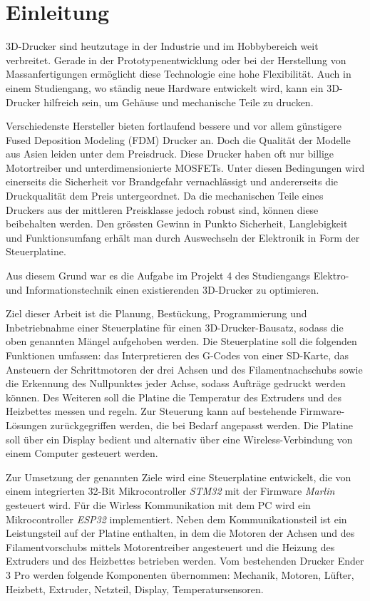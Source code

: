 \section{Einleitung}
\label{sec:Einleitung}

3D-Drucker sind heutzutage in der Industrie und im Hobbybereich weit verbreitet. Gerade in der Prototypenentwicklung oder bei der Herstellung von Massanfertigungen ermöglicht diese Technologie eine hohe Flexibilität. Auch in einem Studiengang, wo ständig neue Hardware entwickelt wird, kann ein 3D-Drucker hilfreich sein, um Gehäuse und mechanische Teile zu drucken.

Verschiedenste Hersteller bieten fortlaufend bessere und vor allem günstigere Fused Deposition Modeling (FDM) Drucker an. Doch die Qualität der Modelle aus Asien leiden unter dem Preisdruck. Diese Drucker haben oft nur billige Motortreiber und unterdimensionierte MOSFETs. Unter diesen Bedingungen wird einerseits die Sicherheit vor Brandgefahr \cite{JohnCogge} vernachlässigt und andererseits die Druckqualität dem Preis untergeordnet. Da die mechanischen Teile eines Druckers aus der mittleren Preisklasse jedoch robust sind, können diese beibehalten werden. Den grössten Gewinn in Punkto Sicherheit, Langlebigkeit und Funktionsumfang erhält man durch Auswechseln der Elektronik in Form der Steuerplatine.

Aus diesem Grund war es die Aufgabe im Projekt 4 des Studiengangs Elektro- und Informationstechnik einen existierenden 3D-Drucker zu optimieren.

Ziel dieser Arbeit ist die Planung, Bestückung, Programmierung und Inbetriebnahme einer Steuerplatine für einen 3D-Drucker-Bausatz, sodass die oben genannten Mängel aufgehoben werden. Die Steuerplatine soll die folgenden Funktionen umfassen: das Interpretieren des G-Codes von einer SD-Karte, das Ansteuern der Schrittmotoren der drei Achsen und des Filamentnachschubs sowie die Erkennung des Nullpunktes jeder Achse, sodass Aufträge gedruckt werden können. Des Weiteren soll die Platine die Temperatur des Extruders und des Heizbettes messen und regeln. Zur Steuerung kann auf bestehende Firmware-Lösungen zurückgegriffen werden, die bei Bedarf angepasst werden. Die Platine soll über ein Display bedient und alternativ über eine Wireless-Verbindung von einem Computer gesteuert werden.\

Zur Umsetzung der genannten Ziele wird eine Steuerplatine entwickelt, die von einem integrierten 32-Bit Mikrocontroller \textit{STM32} mit der Firmware \textit{Marlin} gesteuert wird. Für die Wirless Kommunikation mit dem PC wird ein Mikrocontroller \textit{ESP32} implementiert.
Neben dem Kommunikationsteil ist ein Leistungsteil auf der Platine enthalten, in dem die Motoren der Achsen und des Filamentvorschubs mittels Motorentreiber angesteuert und die Heizung des Extruders und des Heizbettes betrieben werden. Vom bestehenden Drucker Ender 3 Pro werden folgende Komponenten übernommen: Mechanik, Motoren, Lüfter, Heizbett, Extruder, Netzteil, Display, Temperatursensoren.

